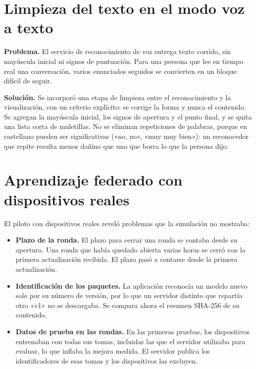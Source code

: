 \section{Limpieza del texto en el modo voz a texto}

\textbf{Problema.} El servicio de reconocimiento de voz entrega texto corrido, sin mayúscula inicial ni signos de puntuación. Para una persona que lee en tiempo real una conversación, varios enunciados seguidos se convierten en un bloque difícil de seguir.

\textbf{Solución.} Se incorporó una etapa de limpieza entre el reconocimiento y la visualización, con un criterio explícito: se corrige la forma y nunca el contenido. Se agregan la mayúscula inicial, los signos de apertura y el punto final, y se quita una lista corta de muletillas. No se eliminan repeticiones de palabras, porque en castellano pueden ser significativas («no, no», «muy muy bien»): un reconocedor que repite resulta menos dañino que uno que borra lo que la persona dijo.

\section{Aprendizaje federado con dispositivos reales}

El piloto con dispositivos reales reveló problemas que la simulación no mostraba:

\begin{itemize}
    \item \textbf{Plazo de la ronda.} El plazo para cerrar una ronda se contaba desde su apertura. Una ronda que había quedado abierta varias horas se cerró con la primera actualización recibida. El plazo pasó a contarse desde la primera actualización.
    \item \textbf{Identificación de los paquetes.} La aplicación reconocía un modelo nuevo solo por su número de versión, por lo que un servidor distinto que repartía otro «v1» no se descargaba. Se compara ahora el resumen SHA-256 de su contenido.
    \item \textbf{Datos de prueba en las rondas.} En las primeras pruebas, los dispositivos entrenaban con todas sus tomas, incluidas las que el servidor utilizaba para evaluar, lo que inflaba la mejora medida. El servidor publica los identificadores de esas tomas y los dispositivos las excluyen.
\end{itemize}
